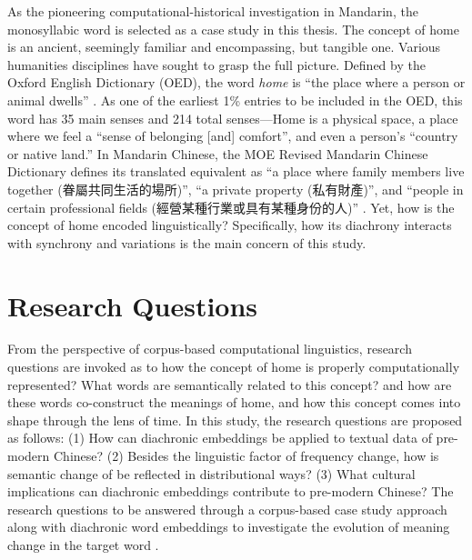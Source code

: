 As the pioneering computational-historical investigation in Mandarin, the monosyllabic word  is selected as a case study in this thesis. The concept of home is an ancient, seemingly familiar and encompassing, but tangible one. Various humanities disciplines have sought to grasp the full picture. Defined by the Oxford English Dictionary (OED), the word \textit{home} is ``the place where a person or animal dwells'' . As one of the earliest 1\% entries to be included in the OED, this word has 35 main senses and 214 total senses—Home is a physical space, a place where we feel a ``sense of belonging [and] comfort'', and even a person's ``country or native land.'' In Mandarin Chinese, the MOE Revised Mandarin Chinese Dictionary defines its translated equivalent  as ``a place where family members live together (眷屬共同生活的場所)'', ``a private property (私有財產)'', and ``people in certain professional fields (經營某種行業或具有某種身份的人)'' . Yet, how is the concept of home encoded linguistically? Specifically, how its diachrony interacts with synchrony and variations is the main concern of this study.

\section{Research Questions}
From the perspective of corpus-based computational linguistics, research questions are invoked as to how the concept of home is properly computationally represented? What words are semantically related to this concept? and how are these words co-construct the meanings of home, and how this concept comes into shape through the lens of time. In this study, the research questions are proposed as follows: (1) How can diachronic embeddings be applied to textual data of pre-modern Chinese? (2) Besides the linguistic factor of frequency change, how is semantic change of \jia be reflected in distributional ways? (3) What cultural implications can diachronic embeddings contribute to pre-modern Chinese? The research questions to be answered through a corpus-based case study approach along with diachronic word embeddings to investigate the evolution of meaning change in the target word \jia\rspace.

